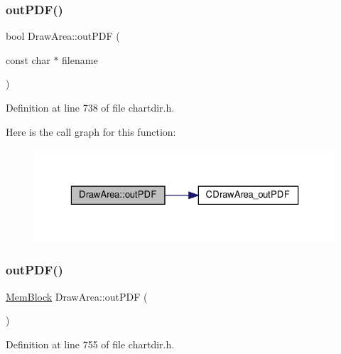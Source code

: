 \subsubsection{\texorpdfstring{out\+P\+D\+F()}{outPDF()}\hspace{0.1cm}{\footnotesize\ttfamily [1/2]}}
{\footnotesize\ttfamily bool Draw\+Area\+::out\+P\+DF (\begin{DoxyParamCaption}\item[{const char $\ast$}]{filename }\end{DoxyParamCaption})\hspace{0.3cm}{\ttfamily [inline]}}



Definition at line 738 of file chartdir.\+h.

Here is the call graph for this function\+:
\nopagebreak
\begin{figure}[H]
\begin{center}
\leavevmode
\includegraphics[width=323pt]{class_draw_area_a13885f1e2559a146b6a1d147503a5a63_cgraph}
\end{center}
\end{figure}
\mbox{\label{class_draw_area_aaf81710b0451baee666aed21f562d693}} 
\subsubsection{\texorpdfstring{out\+P\+D\+F()}{outPDF()}\hspace{0.1cm}{\footnotesize\ttfamily [2/2]}}
{\footnotesize\ttfamily \hyperlink{class_mem_block}{Mem\+Block} Draw\+Area\+::out\+P\+DF (\begin{DoxyParamCaption}{ }\end{DoxyParamCaption})\hspace{0.3cm}{\ttfamily [inline]}}



Definition at line 755 of file chartdir.\+h.

